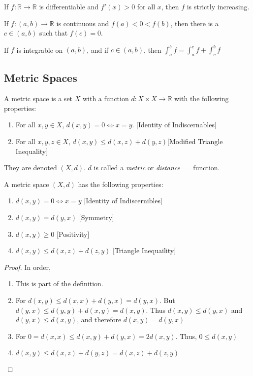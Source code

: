     \begin{theorem}
        If $f:\mathbb{R}\rightarrow \mathbb{R}$
        is differentiable
        and $f'(x)>0$ for all $x$,
        then $f$ is strictly increasing.
    \end{theorem}
    \begin{theorem}
        If $f:(a,b)\rightarrow\mathbb{R}$ is continuous and
        $f(a)<0<f(b)$, then there is a $c\in (a,b)$ such that
        $f(c)=0$.
    \end{theorem}
    \begin{theorem}
        If $f$ is integrable on $(a,b)$, and if $c\in(a,b)$, then
        $\int_{a}^{b}f=\int_{a}^{c}f+\int_{c}^{b}f$
    \end{theorem}
        \subsection{Metric Spaces}
            \begin{definition}
            A metric space is a set $X$ with a function $d:X\times X\rightarrow \mathbb{R}$ with the following properties:
            \begin{enumerate}
            \item For all $x,y\in X$, $d(x,y) = 0\Leftrightarrow x=y$. \hfill [Identity of Indiscernables]
            \item For all $x,y,z\in X$, $d(x,y) \leq d(x,z)+d(y,z)$\hfill [Modified Triangle Inequality]
            \end{enumerate}
            They are denoted $(X,d)$. $d$ is called a
            \textit{metric} or \textit{distance}== function.
            \end{definition}
            \begin{theorem}
            A metric space $(X,d)$ has the following properties:
            \begin{enumerate}
                \item $d(x,y) = 0 \Leftrightarrow x=y$ \hfill [Identity of Indiscernibles]
                \item $d(x,y) = d(y,x)$ \hfill [Symmetry]
                \item $d(x,y) \geq 0$ \hfill [Positivity]
                \item $d(x,y) \leq d(x,z)+d(z,y)$ \hfill [Triangle Inequaility]
            \end{enumerate}
            \end{theorem}
            \begin{proof}
            In order,
            \begin{enumerate}
                \item This is part of the definition.
                \item For $d(x,y) \leq d(x,x)+d(y,x) = d(y,x)$. But $d(y,x) \leq d(y,y)+d(x,y) = d(x,y)$. Thus $d(x,y)\leq d(y,x)$ and $d(y,x) \leq d(x,y)$, and therefore $d(x,y) = d(y,x)$
                \item For $0=d(x,x) \leq d(x,y)+d(y,x) = 2d(x,y)$. Thus, $0\leq d(x,y)$
                \item $d(x,y)\leq d(x,z)+d(y,z) = d(x,z)+d(z,y)$
            \end{enumerate}
            \end{proof}
